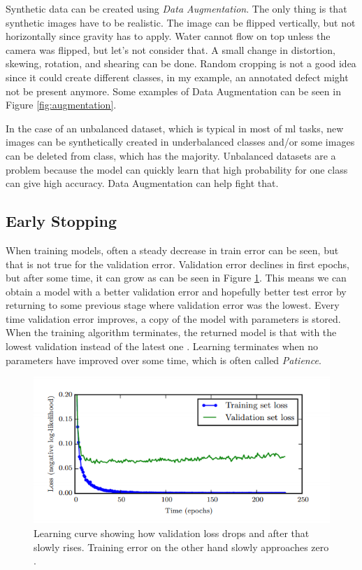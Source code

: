 \documentclass[thesis=B,english]{FITthesis}[2019/12/23]
\begin{document}
    Synthetic data can be created using \emph{Data Augmentation}. The only thing is that synthetic images have to be realistic. The image can be flipped vertically, but not horizontally since gravity has to apply. Water cannot flow on top unless the camera was flipped, but let's not consider that. A small change in distortion, skewing, rotation, and shearing can be done. Random cropping is not a good idea since it could create different classes, in my example, an annotated defect might not be present anymore. Some examples of Data Augmentation can be seen in Figure \ref{fig:augmentation}.
    
    In the case of an unbalanced dataset, which is typical in most of \gls{ml} tasks, new images can be synthetically created in underbalanced classes and/or some images can be deleted from class, which has the majority. Unbalanced datasets are a problem because the model can quickly learn that high probability for one class can give high accuracy. Data Augmentation can help fight that.
  
  
\subsection{Early Stopping}
When training models, often a steady decrease in train error can be seen, but that is not true for the validation error. Validation error declines in first epochs, but after some time, it can grow as can be seen in Figure \ref{fig:early_stopping}. This means we can obtain a model with a better validation error and hopefully better test error by returning to some previous stage where validation error was the lowest. Every time validation error improves, a copy of the model with parameters is stored. When the training algorithm terminates, the returned model is that with the lowest validation instead of the latest one \cite{bengio2017deep}. Learning terminates when no parameters have improved over some time, which is often called \emph{Patience}.

\begin{figure}
    \centering
    \includegraphics[width=\textwidth]{Early_stopping.PNG}
    \caption[Learning curve showing how test and validation error behaves]{Learning curve showing how validation loss drops and after that slowly rises. Training error on the other hand slowly approaches zero \cite{bengio2017deep}.}
    \label{fig:early_stopping}
\end{figure}
\end{document}

